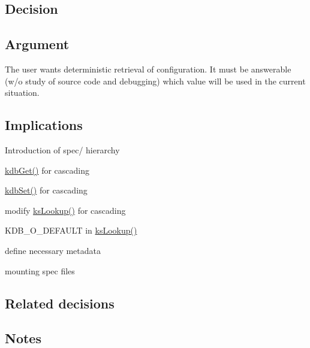 \subsection*{Decision}

\subsection*{Argument}


\begin{DoxyItemize}
\item The user wants deterministic retrieval of configuration. It must be answerable (w/o study of source code and debugging) which value will be used in the current situation.
\end{DoxyItemize}

\subsection*{Implications}


\begin{DoxyEnumerate}
\item Introduction of spec/ hierarchy
\item \hyperlink{group__kdb_ga28e385fd9cb7ccfe0b2f1ed2f62453a1}{kdb\+Get()} for cascading
\item \hyperlink{group__kdb_ga11436b058408f83d303ca5e996832bcf}{kdb\+Set()} for cascading
\item modify \hyperlink{group__keyset_gaa34fc43a081e6b01e4120daa6c112004}{ks\+Lookup()} for cascading
\item K\+D\+B\+\_\+\+O\+\_\+\+D\+E\+F\+A\+U\+LT in \hyperlink{group__keyset_gaa34fc43a081e6b01e4120daa6c112004}{ks\+Lookup()}
\item define necessary metadata
\item mounting spec files
\end{DoxyEnumerate}

\subsection*{Related decisions}

\subsection*{Notes}